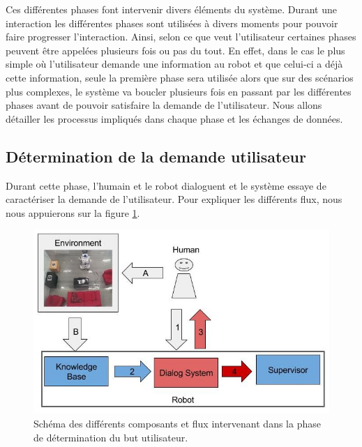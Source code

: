 \documentclass[a4paper,11pt,twoside]{StyleThese}
\begin{document}
Ces différentes phases font intervenir divers éléments du système. Durant une interaction les différentes phases sont utilisées à divers moments pour pouvoir faire progresser l'interaction.
Ainsi, selon ce que veut l'utilisateur certaines phases peuvent être appelées plusieurs fois ou pas du tout.
En effet, dans le cas le plus simple où l'utilisateur demande une information au robot et que celui-ci a déjà cette information, seule la première phase sera utilisée alors que sur des scénarios plus complexes, le système va boucler plusieurs fois en passant par les différentes phases avant de pouvoir satisfaire la demande de l'utilisateur.
Nous allons détailler les processus impliqués dans chaque phase et les échanges de données.

\subsection{Détermination de la demande utilisateur}
\label{sec:phase1}
Durant cette phase, l'humain et le robot dialoguent et le système essaye de caractériser la demande de l'utilisateur. Pour expliquer les différents flux, nous nous appuierons sur la figure \ref{fig:phase1}.


\begin{figure}[ht!]
 \centering
  \includegraphics[width=0.99\linewidth]{./img/phase1color.jpg} 
  \caption {Schéma des différents composants et flux intervenant dans la phase de détermination du but utilisateur.}
  \label{fig:phase1}
\end{figure}
\end{document}
